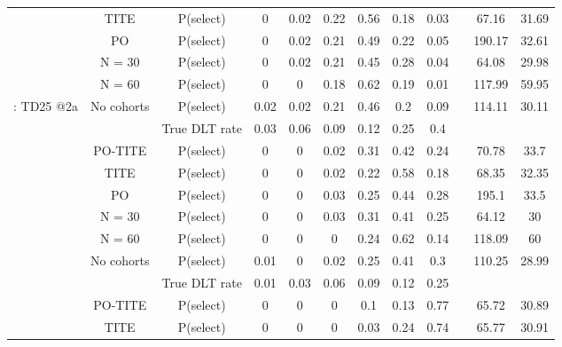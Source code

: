 \begin{table}
\begin{singlespace}
{\begin{tabular}[t]{cccccccccccc}
				& TITE & P(select) & 0 & 0.02 & 0.22 & 0.56 & 0.18 & 0.03 &  & 67.16 & 31.69\\
				
				& PO & P(select) & 0 & 0.02 & 0.21 & 0.49 & 0.22 & 0.05 &  & 190.17 & 32.61\\
				
				& N = 30 & P(select) & 0 & 0.02 & 0.21 & 0.45 & 0.28 & 0.04 &  & 64.08 & 29.98\\
				
				& N = 60 & P(select) & 0 & 0 & 0.18 & 0.62 & 0.19 & 0.01 &  & 117.99 & 59.95\\
				
				\multirow{-7}{*}{\centering\arraybackslash 4: TD25 @2a} & No cohorts & P(select) & 0.02 & 0.02 & 0.21 & 0.46 & 0.2 & 0.09 &  & 114.11 & 30.11\\
				\cmidrule{1-12}
				\rowcolor{gray!6}   &  & True DLT rate & 0.03 & 0.06 & 0.09 & 0.12 & 0.25 & 0.4 &  &  & \\
				
				\rowcolor{gray!6}   & PO-TITE & P(select) & 0 & 0 & 0.02 & 0.31 & 0.42 & 0.24 &  & 70.78 & 33.7\\
				
				\rowcolor{gray!6}   & TITE & P(select) & 0 & 0 & 0.02 & 0.22 & 0.58 & 0.18 &  & 68.35 & 32.35\\
				
				\rowcolor{gray!6}   & PO & P(select) & 0 & 0 & 0.03 & 0.25 & 0.44 & 0.28 &  & 195.1 & 33.5\\
				
				\rowcolor{gray!6}   & N = 30 & P(select) & 0 & 0 & 0.03 & 0.31 & 0.41 & 0.25 &  & 64.12 & 30\\
				
				\rowcolor{gray!6}   & N = 60 & P(select) & 0 & 0 & 0 & 0.24 & 0.62 & 0.14 &  & 118.09 & 60\\
				
				\rowcolor{gray!6}  \multirow{-7}{*}{\centering\arraybackslash 5: TD25 @2b} & No cohorts & P(select) & 0.01 & 0 & 0.02 & 0.25 & 0.41 & 0.3 &  & 110.25 & 28.99\\
				\cmidrule{1-12}
				&  & True DLT rate & 0.01 & 0.03 & 0.06 & 0.09 & 0.12 & 0.25 &  &  & \\
				
				& PO-TITE & P(select) & 0 & 0 & 0 & 0.1 & 0.13 & 0.77 &  & 65.72 & 30.89\\
				
				& TITE & P(select) & 0 & 0 & 0 & 0.03 & 0.24 & 0.74 &  & 65.77 & 30.91\\
				

\end{tabular}}
\end{singlespace}
\end{table}
